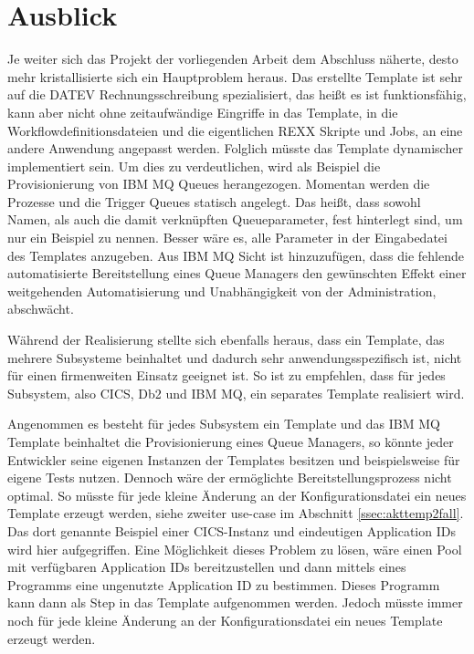\chapter{Ausblick}\label{ch:ausblick}
Je weiter sich das Projekt der vorliegenden Arbeit dem Abschluss näherte, desto mehr kristallisierte sich ein Hauptproblem heraus.
Das erstellte Template ist sehr auf die DATEV Rechnungsschreibung spezialisiert, das heißt es ist funktionsfähig, kann aber nicht ohne zeitaufwändige Eingriffe in das Template, in die Workflowdefinitionsdateien und die eigentlichen REXX Skripte und Jobs, an eine andere Anwendung angepasst werden. 
Folglich müsste das Template dynamischer implementiert sein.
Um dies zu verdeutlichen, wird als Beispiel die Provisionierung von IBM MQ Queues herangezogen.
Momentan werden die Prozesse und die Trigger Queues statisch angelegt.
Das heißt, dass sowohl Namen, als auch die damit verknüpften Queueparameter, fest hinterlegt sind, um nur ein Beispiel zu nennen.
Besser wäre es, alle Parameter in der Eingabedatei des Templates anzugeben.
Aus IBM MQ Sicht ist hinzuzufügen, dass die fehlende automatisierte Bereitstellung eines Queue Managers den gewünschten Effekt einer weitgehenden Automatisierung und Unabhängigkeit von der Administration, abschwächt.

Während der Realisierung stellte sich ebenfalls heraus, dass ein Template, das mehrere Subsysteme beinhaltet und dadurch sehr anwendungsspezifisch ist, nicht für einen firmenweiten Einsatz geeignet ist.
So ist zu empfehlen, dass für jedes Subsystem, also CICS, Db2 und IBM MQ, ein separates Template realisiert wird.

Angenommen es besteht für jedes Subsystem ein Template und das IBM MQ Template beinhaltet die Provisionierung eines Queue Managers, so könnte jeder Entwickler seine eigenen Instanzen der Templates besitzen und beispielsweise für eigene Tests nutzen.
Dennoch wäre der ermöglichte Bereitstellungsprozess nicht optimal.
So müsste für jede kleine Änderung an der Konfigurationsdatei ein neues Template erzeugt werden, siehe zweiter use-case im Abschnitt \ref{ssec:akttemp2fall}.
Das dort genannte Beispiel einer CICS-Instanz und eindeutigen Application IDs wird hier aufgegriffen.
Eine Möglichkeit dieses Problem zu lösen, wäre einen Pool mit verfügbaren Application IDs bereitzustellen und dann mittels eines Programms eine ungenutzte Application ID zu bestimmen.
Dieses Programm kann dann als Step in das Template aufgenommen werden.
Jedoch müsste immer noch für jede kleine Änderung an der Konfigurationsdatei ein neues Template erzeugt werden.

